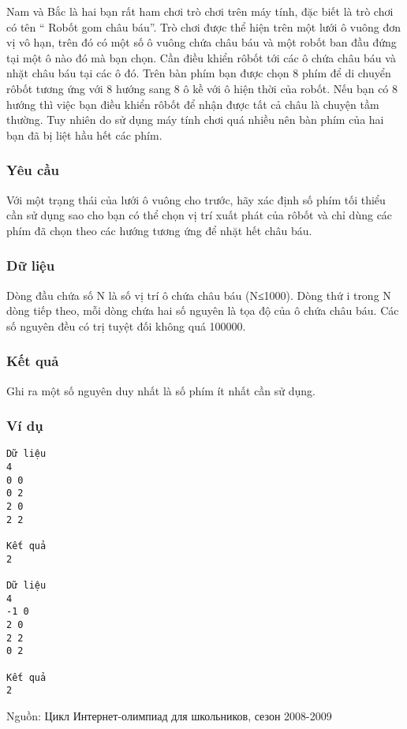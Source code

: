 



   Nam và  Bắc là hai bạn rất ham chơi trò chơi trên máy tính, đặc biết là trò chơi có tên “ Robốt gom châu báu”. Trò chơi được thể hiện trên một lưới ô vuông đơn vị vô hạn, trên đó có một số ô vuông chứa châu báu và một robốt ban đầu đứng tại một ô nào đó mà bạn chọn. Cần điều khiển rôbốt tới các ô chứa châu báu và nhặt châu báu tại các ô đó. Trên bàn phím bạn được chọn 8 phím để di chuyển rôbốt tương ứng với 8 hướng sang 8 ô kề với ô hiện thời của robốt. Nếu bạn có 8 hướng thì việc bạn điều khiển rôbốt để nhận được tất cả châu là chuyện tầm thường. Tuy nhiên do sử dụng máy tính chơi quá nhiều nên bàn phím của hai bạn đã bị liệt hầu hết các phím.  

\subsubsection{   Yêu cầu  }

   Với một trạng thái của lưới ô vuông cho trước, hãy xác định số phím tối thiểu cần sử dụng sao cho bạn có thể chọn vị trí xuất phát của rôbốt và chỉ dùng các phím đã chọn theo các hướng tương ứng để nhặt hết châu báu.  

\subsubsection{   Dữ liệu  }

   Dòng đầu chứa số N là số vị trí ô chứa châu báu (N≤1000). Dòng thứ i trong N dòng tiếp theo, mỗi dòng chứa hai số nguyên là tọa độ của ô chứa châu báu. Các số nguyên đều có trị tuyệt đối không quá 100000.  

\subsubsection{   Kết quả  }

   Ghi ra một số nguyên duy nhất là số phím ít nhất cần sử dụng.  

\subsubsection{   Ví dụ  }
\begin{verbatim}
Dữ liệu
4
0 0
0 2
2 0
2 2

Kết quả
2

Dữ liệu
4
-1 0
2 0
2 2
0 2

Kết quả
2
\end{verbatim}

   Nguồn: Цикл Интернет-олимпиад для школьников, сезон 2008-2009  